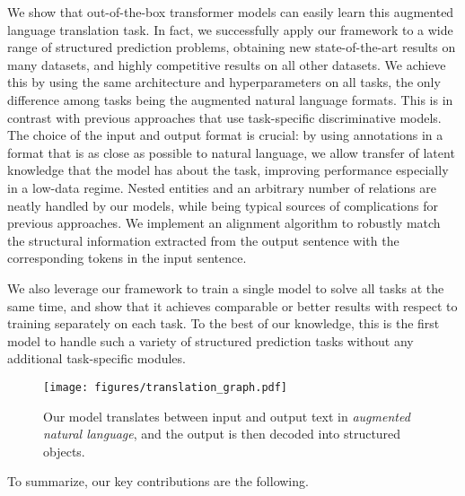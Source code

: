 We show that out-of-the-box transformer models can easily learn this augmented language translation task.
In fact, we successfully apply our framework to a wide range of structured prediction problems, obtaining new state-of-the-art results on many datasets, and highly competitive results on all other datasets.
We achieve this by using the same architecture and hyperparameters on all tasks, the only difference among tasks being the augmented natural language formats.
This is in contrast with previous approaches that use task-specific discriminative models.
The choice of the input and output format is crucial: by using annotations in a format that is as close as possible to natural language, we allow transfer of latent knowledge that the \pretrained model has about the task, improving performance especially in a low-data regime.
Nested entities and an arbitrary number of relations
are neatly handled by our models, while being typical sources of complications for previous approaches.
We implement an alignment algorithm to robustly match the structural information extracted from the output sentence with the corresponding tokens in the input sentence.

We also leverage our framework to train a single model to solve all tasks at the same time, and show that it achieves comparable or better results with respect to training separately on each task.
To the best of our knowledge, this is the first model to handle such a variety of structured prediction tasks without any additional task-specific modules.

\begin{figure}[t]
\begin{center}
    \texttt{[image: figures/translation\_graph.pdf]}
\end{center}
\caption{
Our \ourmodel{} model translates between input and output text in \emph{augmented natural language}, and the output is then decoded into structured objects. 
}
\label{fig:main_model}
\end{figure}

To summarize, our key contributions are the following.

